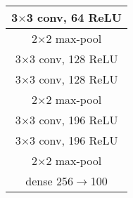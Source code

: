 \documentclass[11pt]{article}
\begin{document}
\begin{table}[!h]
\begin{minipage}{0.55\linewidth}
{\begin{tabular}{c}
			3$\times$3 conv, 64 ReLU    \\
			\hline
			2$\times$2 max-pool\\
			\hline
			3$\times$3 conv, 128 ReLU   \\
			3$\times$3 conv, 128 ReLU    \\
		    \hline
			2$\times$2 max-pool\\
			\hline
			3$\times$3 conv, 196 ReLU  \\
			3$\times$3 conv, 196 ReLU  \\
			\hline
			2$\times$2 max-pool \\ \hline
            dense 256$\rightarrow$100 \\ \hline
		\end{tabular}
	}
	\end{minipage}
\end{table}


\newpage


\end{document}
